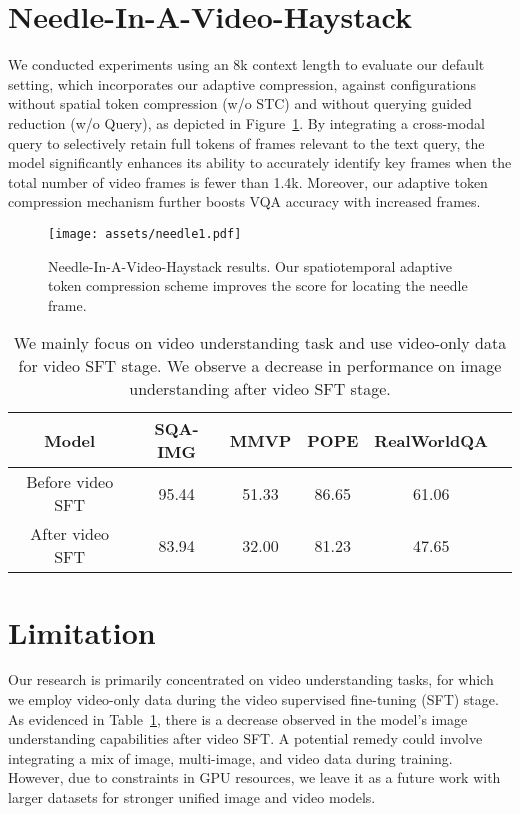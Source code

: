 \section{Needle-In-A-Video-Haystack}

We conducted experiments using an 8k context length to evaluate our default setting, which incorporates our adaptive compression, against configurations without spatial token compression (w/o STC) and without querying guided reduction  (w/o Query), as depicted in Figure~\ref{fig:needle1}. By integrating a cross-modal query to selectively retain full tokens of frames relevant to the text query, the model significantly enhances its ability to accurately identify key frames when the total number of video frames is fewer than 1.4k. Moreover, our adaptive token compression mechanism further boosts VQA accuracy with increased frames.

\begin{figure}[h]
    \centering
    \texttt{[image: assets/needle1.pdf]}
    \caption{Needle-In-A-Video-Haystack results. Our spatiotemporal adaptive token compression scheme improves the score for locating the needle frame.}
    \label{fig:needle1}
\end{figure}

\begin{table}[!ht]
    \centering
    \renewcommand{\arraystretch}{1.3}
    \begin{tabular}{cccccc}
    \toprule
        \textbf{Model} & \textbf{SQA-IMG} & \textbf{MMVP} & \textbf{POPE} &  \textbf{RealWorldQA} \\
        \midrule
        Before video SFT & 95.44 & 51.33 & 86.65 & 61.06 \\
        After video SFT & 83.94 & 32.00 & 81.23 & 47.65 \\
        \bottomrule
    \end{tabular}
    \caption{We mainly focus on video understanding task and use video-only data for video SFT stage. We observe a decrease in performance on image understanding after video SFT stage.}
    \label{tab:image}
\end{table}

\section{Limitation}

Our research is primarily concentrated on video understanding tasks, for which we employ video-only data during the video supervised fine-tuning (SFT) stage. As evidenced in Table~\ref{tab:image}, there is a decrease observed in the model's image understanding capabilities after video SFT. A potential remedy could involve integrating a mix of image, multi-image, and video data during training. However, due to constraints in GPU resources, we leave it as a future work with larger datasets for stronger unified image and video models.

